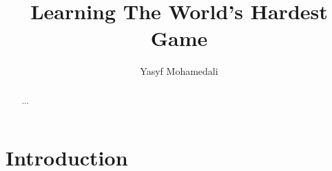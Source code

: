 \documentclass[preprint,12pt]{elsarticle}
\begin{document}
\begin{frontmatter}
\title{Learning The World's Hardest Game}

\author{Yasyf Mohamedali}

\address{6.867 Project}

\begin{abstract}
...
\end{abstract}
\end{frontmatter}

\section{Introduction}
\end{document}
